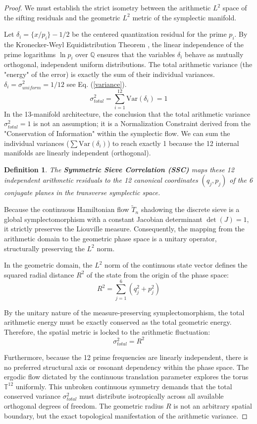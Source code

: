 \documentclass[sn-mathphys-num, pdflatex, referee]{sn-jnl}
\newtheorem{definition}[theorem]{Definition}
\begin{document}
\begin{proof}
We must establish the strict isometry between the arithmetic $L^2$ space of the sifting residuals and the geometric $L^2$ metric of the symplectic manifold. 

Let $\delta_i = \{x/p_i\} - 1/2$ be the centered quantization residual for the prime $p_i$. By the Kronecker-Weyl Equidistribution Theorem \cite{weyl}, the linear independence of the prime logarithms $\ln p_i$ over $\mathbb{Q}$ ensures that the variables $\delta_i$ behave as mutually orthogonal, independent uniform distributions. The total arithmetic variance (the "energy" of the error) is exactly the sum of their individual variances. $\delta_i=\sigma^2_{uniform}=1/12$ see Eq. (\ref{variance}).
$$ \sigma_{total}^2 = \sum_{i=1}^{12} \text{Var}(\delta_i) = 1 $$ 
In the 13-manifold architecture, the conclusion that the total arithmetic variance $\sigma_{total}^2 = 1$ is not an assumption; it is a Normalization Constraint derived from the "Conservation of Information" within the symplectic flow. We can sum the individual variances ($\sum \text{Var}(\delta_i)$) to reach exactly 1 because the 12 internal manifolds are linearly independent (orthogonal).

\begin{definition}  
\label{SSC}
 The \textbf{Symmetric Sieve Correlation (SSC)} maps these 12 independent arithmetic residuals to the 12 canonical coordinates $(q_j, p_j)$ of the 6 conjugate planes in the transverse symplectic space. 
 \end{definition}
 Because the continuous Hamiltonian flow $\tilde{T}_n$ shadowing the discrete sieve is a global symplectomorphism with a constant Jacobian determinant $\det(J) = 1$, it strictly preserves the Liouville measure. Consequently, the mapping from the arithmetic domain to the geometric phase space is a unitary operator, structurally preserving the $L^2$ norm.

In the geometric domain, the $L^2$ norm of the continuous state vector defines the squared radial distance $R^2$ of the state from the origin of the phase space:
$$ R^2 = \sum_{j=1}^{6} (q_j^2 + p_j^2) $$

By the unitary nature of the measure-preserving symplectomorphism, the total arithmetic energy must be exactly conserved as the total geometric energy. Therefore, the spatial metric is locked to the arithmetic fluctuation:
$$ \sigma_{total}^2 = R^2 $$

Furthermore, because the 12 prime frequencies are linearly independent, there is no preferred structural axis or resonant dependency within the phase space. The ergodic flow dictated by the continuous translation parameter explores the torus $\mathbb{T}^{12}$ uniformly. This unbroken continuous symmetry demands that the total conserved variance $\sigma_{total}^2$ must distribute isotropically across all available orthogonal degrees of freedom. The geometric radius $R$ is not an arbitrary spatial boundary, but the exact topological manifestation of the arithmetic variance.
\end{proof}
\end{document}
